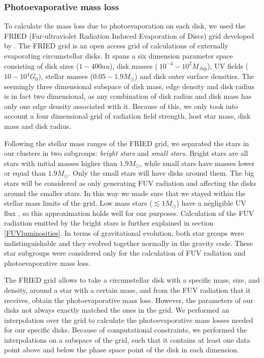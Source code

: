 \documentclass[fleqn,usenatbib]{mnras}
\begin{document}
\subsubsection{Photoevaporative mass loss}\label{grid}
To calculate the mass loss due to photoevaporation on each disk, we used the FRIED (Far-ultraviolet Radiation Induced Evaporation of Discs) grid developed by \citet{haworth2018}. The FRIED grid is an open access grid of calculations of externally evaporating circumstellar disks. It spans a six dimension parameter space consisting of disk sizes ($1 - 400 au$), disk masses ($~10^{-4} - 10^{2} M_{Jup}$), UV fields ($10 - 10^{4} G_0$), stellar masses ($0.05 - 1.9 M_{\odot}$) and disk outer surface densities. The seemingly
three dimensional subspace of disk mass, edge density and disk radius is in fact two dimensional, as any combination of disk radius and disk mass has only one edge density associated with it. Because of this, we only took into account a four dimensional grid of radiation field strength, host star mass, disk mass and disk radius.

Following the stellar mass ranges of the FRIED grid, we separated the stars in our clusters in two subgroups: \textit{bright stars} and \textit{small stars}. Bright stars are all stars with initial masses higher than $1.9 M_{\odot}$, while small stars have masses lower or equal than $1.9 M_{\odot}$. Only the small stars will have disks around them. The big stars will be considered as only generating FUV radiation and affecting the disks around the smaller stars. In this way we made sure that we stayed within the stellar mass limits of the grid. Low mass stars ($\lesssim 1 M_\odot$) have a negligible UV flux \citep{adams2006}, so this approximation holds well for our purposes. Calculation of the FUV radiation emitted by the bright stars is further explained in section \ref{FUVluminosities}. In terms of gravitational evolution, both star groups were indistinguishable and they evolved together normally in the gravity code. These star subgroups were considered only for the calculation of FUV radiation and photoevaporative mass loss.

The FRIED grid allows to take a circumstellar disk with a specific mass, size, and density, around a star with a certain mass, and from the FUV radiation that it receives, obtain the photoevaporative mass loss. However, the parameters of our disks not always exactly matched the ones in the grid. We performed an interpolation over the grid to calculate the photoevaporative mass losses needed for our specific disks. Because of computational constraints, we performed the interpolations on a subspace of the grid, such that it contains at least one data point above and below the phase space point of the disk in each dimension.
\end{document}
